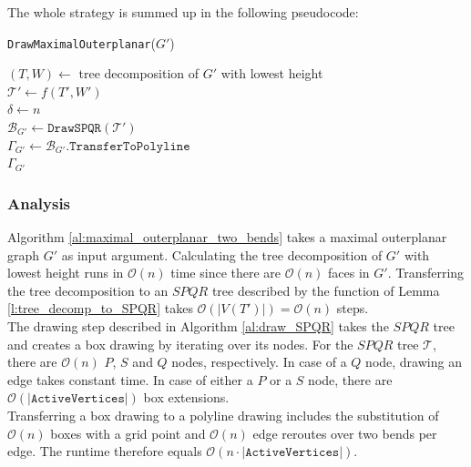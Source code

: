 The whole strategy is summed up in the following pseudocode:\\
\begin{algorithm}[H]
	\caption{\texttt{DrawMaximalOuterplanar}($G'$)}\label{al:maximal_outerplanar_two_bends}
	$(T,W) \gets$ tree decomposition of $G'$ with lowest height\\
	$\mathcal{T'} \gets f(T',W')$\\
	$\delta \gets n$\\
	$\mathcal{B}_{G'} \gets \texttt{DrawSPQR}(\mathcal{T'})$\\
	$\Gamma_{G'} \gets \mathcal{B}_{G'}.\texttt{TransferToPolyline}$\\
	\Return $\Gamma_{G'}$
\end{algorithm}

\subsubsection{Analysis}

Algorithm \ref{al:maximal_outerplanar_two_bends} takes a maximal outerplanar graph $G'$ as input argument. Calculating the tree decomposition of $G'$ with lowest height runs in $\mathcal{O}(n)$ time since there are $\mathcal{O}(n)$ faces in $G'$. Transferring the tree decomposition to an $SPQR$ tree described by the function of Lemma \ref{l:tree_decomp_to_SPQR} takes $\mathcal{O}(|V(T')|) = \mathcal{O}(n)$ steps.\\
The drawing step described in Algorithm \ref{al:draw_SPQR} takes the $SPQR$ tree and creates a box drawing by iterating over its nodes. For the $SPQR$ tree $\mathcal{T}$, there are $\mathcal{O}(n)$ $P$, $S$ and $Q$ nodes, respectively. In case of a $Q$ node, drawing an edge takes constant time. In case of either a $P$ or a $S$ node, there are $\mathcal{O}(|\texttt{ActiveVertices}|)$ box extensions.\\
Transferring a box drawing to a polyline drawing includes the substitution of $\mathcal{O}(n)$ boxes with a grid point and $\mathcal{O}(n)$ edge reroutes over two bends per edge. The runtime therefore equals $\mathcal{O}(n\cdot |\texttt{ActiveVertices}|)$.

